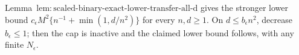 Lemma~\(\mathrm{lem:scaled\text{-}binary\text{-}exact\text{-}lower\text{-}transfer\text{-}all\text{-}d}\) gives the stronger lower bound \(c_{\epsilon}M^2\{n^{-1}+\min(1,d/n^2)\}\) for every \(n,d\ge1\).  On \(d\le b_{\epsilon}n^2\), decrease \(b_{\epsilon}\le1\); then the cap is inactive and the claimed lower bound follows, with any finite \(N_{\epsilon}\).
